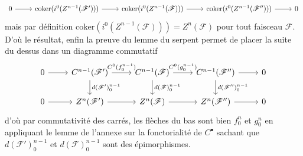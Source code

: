\documentclass[a4paper,12pt]{article}
\newcommand{\F}{\mathscr F}
\newcommand{\coker}{\textrm{coker}}
\theoremstyle{plain}
\theoremstyle{definition}
\theoremstyle{remark}
\begin{document}
\[\begin{tikzcd}
	0 & {\coker(i^0(Z^{n-1}(\F')))} & {\coker(i^0(Z^{n-1}(\F)))} & {\coker(i^0(Z^{n-1}(\F'')))} & 0
	\arrow[from=1-1, to=1-2]
	\arrow[from=1-2, to=1-3]
	\arrow[from=1-3, to=1-4]
	\arrow[from=1-4, to=1-5]
\end{tikzcd}\]
mais par définition $\coker(i^0(Z^{n-1}(\F)))=Z^n(\F)$ pour tout 
faisceau $\F$. D'où le résultat, enfin la preuve du lemme du serpent
permet de placer la suite du dessus dans un diagramme commutatif
\[\begin{tikzcd}
	0 & {C^{n-1}(\F')} & {C^{n-1}(\F)} & {C^{n-1}(\F'')} & 0 \\
	0 & {Z^{n}(\F')} & {Z^{n}(\F)} & {Z^{n}(\F'')} & 0
	\arrow[from=1-1, to=1-2]
	\arrow["{C^0(f_0^{n-1})}", from=1-2, to=1-3]
	\arrow["d(\F')_0^{n-1}",from=1-2, to=2-2]
	\arrow["{C^0(g_0^{n-1})}", from=1-3, to=1-4]
	\arrow["d(\F)_0^{n-1}",from=1-3, to=2-3]
	\arrow[from=1-4, to=1-5]
	\arrow["d(\F'')_0^{n-1}",from=1-4, to=2-4]
	\arrow[from=2-1, to=2-2]
	\arrow[from=2-2, to=2-3]
	\arrow[from=2-3, to=2-4]
	\arrow[from=2-4, to=2-5]
\end{tikzcd}\]
d'où par commutativité des carrés, les flèches du bas sont bien 
$f_0^n$ et $g_0^n$ en appliquant le lemme de l'annexe sur la 
fonctorialité de $C^\bullet$ sachant que $d(\F')_0^{n-1}$ et 
$d(\F)_0^{n-1}$ sont des épimorphismes.
\newline
\end{document}
